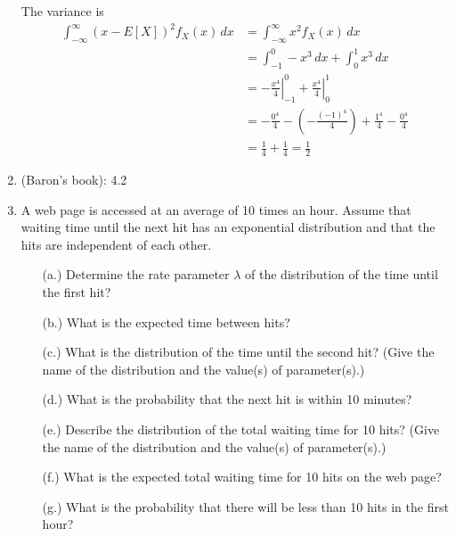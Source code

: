 \begin{enumerate}
{\begin{enumerate}
The variance is 
\begin{align*} 
\int_{-\infty}^\infty (x-E[X])^2 f_X(x) \, dx &= \int_{-\infty}^\infty x^2 f_X(x) \, dx \\
&= \int_{-1}^0 -x^3 \, dx + \int_0^1 x^3 \, dx  \\
&=  \left. -\frac{x^4}{4}\right|_{-1}^0 +  \left. \frac{x^4}{4}\right|_0^1 \\
&= -\frac{0^4}{4} - \left( -\frac{(-1)^4}{4} \right) + \frac{1^4}{4} - \frac{0^4}{4} \\
&= \frac{1}{4} + \frac{1}{4} = \frac{1}{2}
\end{align*}
\end{enumerate}
}

 \item (Baron's book): 4.2



\item A web page is accessed at an average of 10 times an hour. Assume that waiting time until the next hit has an exponential distribution and that the hits are independent of each other. 
\begin{itemize}
\item[(a.)] Determine the rate parameter $\lambda$ of the distribution of the time until the first hit?
\item[(b.)] What is the expected time between hits?
\item[(c.)] What is the distribution of the time until the second hit? (Give the name of the distribution and the value(s) of parameter(s).) 
\item[(d.)] What is the probability that the next hit is within 10 minutes?
\item[(e.)] Describe the distribution of the total waiting time for 10 hits?  (Give the name of the distribution and the value(s) of parameter(s).)
 \item[(f.)] What is the expected total waiting time for 10 hits on the web page?
\item[(g.)] What is the probability that there will be less than 10 hits in the first hour?
\end{itemize}


\end{enumerate}
